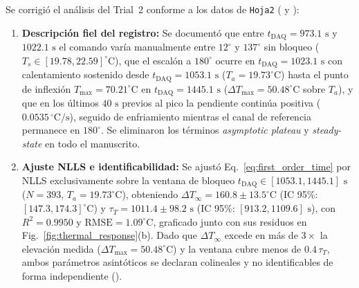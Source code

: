 \documentclass{LabDSTresponse}
\begin{document}
{Se corrigió el análisis del Trial~2 conforme a los datos de \texttt{Hoja2} ( y ):
\begin{enumerate}
    \item \textbf{Descripción fiel del registro:} Se documentó que entre $t_{\text{DAQ}} = 973.1\text{ s}$ y $1022.1\text{ s}$ el comando varía manualmente entre $12^\circ$ y $137^\circ$ sin bloqueo ($T_s \in [19.78, 22.59]^\circ\text{C}$), que el escalón a $180^\circ$ ocurre en $t_{\text{DAQ}} = 1023.1\text{ s}$ con calentamiento sostenido desde $t_{\text{DAQ}} = 1053.1\text{ s}$ ($T_a = 19.73^\circ\text{C}$) hasta el punto de inflexión $T_{\max} = 70.21^\circ\text{C}$ en $t_{\text{DAQ}} = 1445.1\text{ s}$ ($\Delta T_{\max} = 50.48^\circ\text{C}$ sobre $T_a$), y que en los últimos $40\text{ s}$ previos al pico la pendiente continúa positiva ($0.0535\,^\circ\text{C/s}$), seguido de enfriamiento mientras el canal de referencia permanece en $180^\circ$. Se eliminaron los términos \textit{asymptotic plateau} y \textit{steady-state} en todo el manuscrito.
    \item \textbf{Ajuste NLLS e identificabilidad:} Se ajustó Eq.~\eqref{eq:first_order_time} por NLLS exclusivamente sobre la ventana de bloqueo $t_{\text{DAQ}} \in [1053.1, 1445.1]\text{ s}$ ($N = 393$, $T_a = 19.73^\circ\text{C}$), obteniendo $\Delta T_\infty = 160.8 \pm 13.5^\circ\text{C}$ (IC 95\%: $[147.3, 174.3]^\circ\text{C}$) y $\tau_T = 1011.4 \pm 98.2\text{ s}$ (IC 95\%: $[913.2, 1109.6]\text{ s}$), con $R^2 = 0.9950$ y $\text{RMSE} = 1.09^\circ\text{C}$, graficado junto con sus residuos en Fig.~\ref{fig:thermal_response}(b). Dado que $\Delta T_\infty$ excede en más de $3\times$ la elevación medida ($\Delta T_{\max} = 50.48^\circ\text{C}$) y la ventana cubre menos de $0.4\,\tau_T$, ambos parámetros asintóticos se declaran colineales y no identificables de forma independiente ().
\end{enumerate}}
\end{document}
